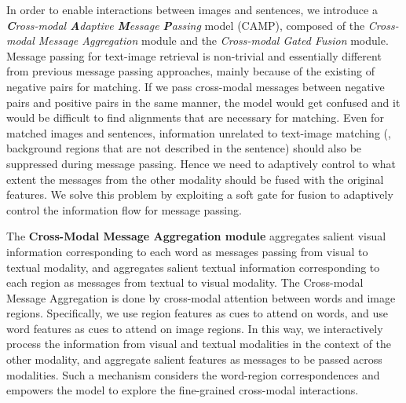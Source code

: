 \documentclass[10pt,twocolumn,letterpaper]{article}
\begin{document}
In order to enable interactions between images and sentences, we introduce a \textit{\textbf{C}ross-modal \textbf{A}daptive \textbf{M}essage \textbf{P}assing} model (CAMP), composed of the \textit{Cross-modal Message Aggregation} module and the \textit{Cross-modal Gated Fusion} module. 
Message passing for text-image retrieval is non-trivial and essentially different from previous message passing approaches, mainly because of the existing of negative pairs for matching. 
If we pass cross-modal messages between negative pairs and positive pairs in the same manner, the model would get confused and it would be difficult to find alignments that are necessary for matching.
Even for matched images and sentences, information unrelated to text-image matching (\eg, background regions that are not described in the sentence) should also be suppressed during message passing.
Hence we need to adaptively control to what extent the messages from the other modality should be fused with the original features.
We solve this problem by exploiting a soft gate for fusion to adaptively control the information flow for message passing.



The \textbf{Cross-Modal Message Aggregation module} aggregates salient visual information corresponding to each word as messages passing from visual to textual modality, and aggregates salient textual information corresponding to each region as messages from textual to visual modality. 
The Cross-modal Message Aggregation is done by cross-modal attention between words and image regions. 
Specifically, we use region features as cues to attend on words, and use word features as cues to attend on image regions.
In this way, we interactively process the information from visual and textual modalities in the context of the other modality, and aggregate salient features as messages to be passed across modalities.
Such a mechanism considers the word-region correspondences and empowers the model to explore the fine-grained cross-modal interactions.
\end{document}
